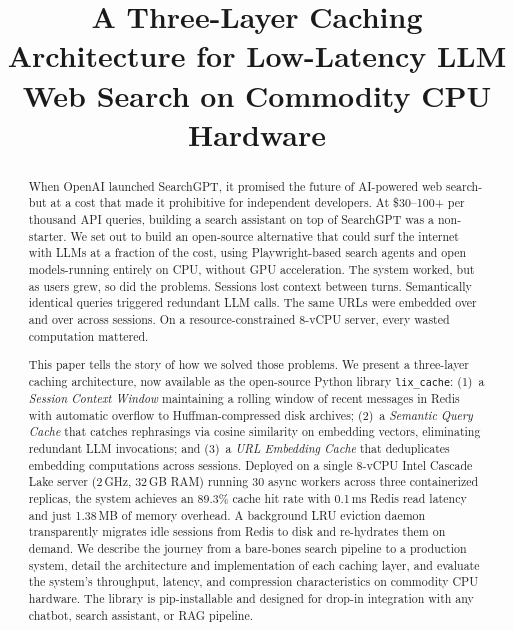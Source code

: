 \documentclass[conference]{IEEEtran}
\title{A Three-Layer Caching Architecture for Low-Latency LLM Web Search on Commodity CPU Hardware}
\author{
\IEEEauthorblockN{Ayushman Bhattacharya}
\IEEEauthorblockA{MyceliAI AÜ\\ayushman@myceli.ai}
}
\begin{document}
\maketitle

\begin{abstract}
When OpenAI launched SearchGPT, it promised the future of AI-powered web search-but at a cost that made it prohibitive for independent developers. At \$30--100+ per thousand API queries, building a search assistant on top of SearchGPT was a non-starter. We set out to build an open-source alternative that could surf the internet with LLMs at a fraction of the cost, using Playwright-based search agents and open models-running entirely on CPU, without GPU acceleration. The system worked, but as users grew, so did the problems. Sessions lost context between turns. Semantically identical queries triggered redundant LLM calls. The same URLs were embedded over and over across sessions. On a resource-constrained 8-vCPU server, every wasted computation mattered.

This paper tells the story of how we solved those problems. We present a three-layer caching architecture, now available as the open-source Python library \texttt{lix\_cache}: (1)~a \emph{Session Context Window} maintaining a rolling window of recent messages in Redis with automatic overflow to Huffman-compressed disk archives; (2)~a \emph{Semantic Query Cache} that catches rephrasings via cosine similarity on embedding vectors, eliminating redundant LLM invocations; and (3)~a \emph{URL Embedding Cache} that deduplicates embedding computations across sessions. Deployed on a single 8-vCPU Intel Cascade Lake server (2\,GHz, 32\,GB RAM) running 30 async workers across three containerized replicas, the system achieves an 89.3\% cache hit rate with 0.1\,ms Redis read latency and just 1.38\,MB of memory overhead. A background LRU eviction daemon transparently migrates idle sessions from Redis to disk and re-hydrates them on demand. We describe the journey from a bare-bones search pipeline to a production system, detail the architecture and implementation of each caching layer, and evaluate the system's throughput, latency, and compression characteristics on commodity CPU hardware. The library is pip-installable and designed for drop-in integration with any chatbot, search assistant, or RAG pipeline.
\end{abstract}
\end{document}
